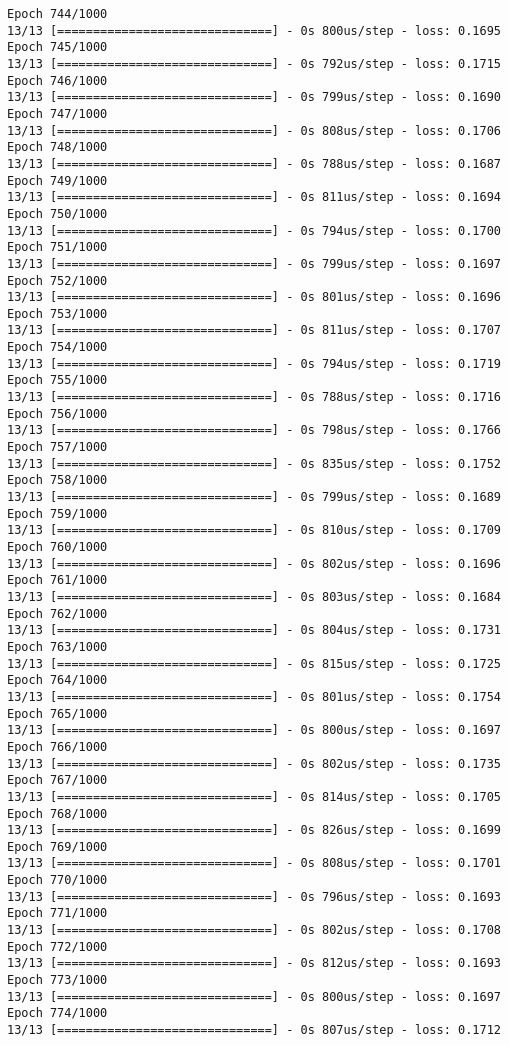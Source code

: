 \documentclass[11pt]{article}
\begin{document}
\begin{Verbatim}[commandchars=\\\{\}]
Epoch 744/1000
13/13 [==============================] - 0s 800us/step - loss: 0.1695
Epoch 745/1000
13/13 [==============================] - 0s 792us/step - loss: 0.1715
Epoch 746/1000
13/13 [==============================] - 0s 799us/step - loss: 0.1690
Epoch 747/1000
13/13 [==============================] - 0s 808us/step - loss: 0.1706
Epoch 748/1000
13/13 [==============================] - 0s 788us/step - loss: 0.1687
Epoch 749/1000
13/13 [==============================] - 0s 811us/step - loss: 0.1694
Epoch 750/1000
13/13 [==============================] - 0s 794us/step - loss: 0.1700
Epoch 751/1000
13/13 [==============================] - 0s 799us/step - loss: 0.1697
Epoch 752/1000
13/13 [==============================] - 0s 801us/step - loss: 0.1696
Epoch 753/1000
13/13 [==============================] - 0s 811us/step - loss: 0.1707
Epoch 754/1000
13/13 [==============================] - 0s 794us/step - loss: 0.1719
Epoch 755/1000
13/13 [==============================] - 0s 788us/step - loss: 0.1716
Epoch 756/1000
13/13 [==============================] - 0s 798us/step - loss: 0.1766
Epoch 757/1000
13/13 [==============================] - 0s 835us/step - loss: 0.1752
Epoch 758/1000
13/13 [==============================] - 0s 799us/step - loss: 0.1689
Epoch 759/1000
13/13 [==============================] - 0s 810us/step - loss: 0.1709
Epoch 760/1000
13/13 [==============================] - 0s 802us/step - loss: 0.1696
Epoch 761/1000
13/13 [==============================] - 0s 803us/step - loss: 0.1684
Epoch 762/1000
13/13 [==============================] - 0s 804us/step - loss: 0.1731
Epoch 763/1000
13/13 [==============================] - 0s 815us/step - loss: 0.1725
Epoch 764/1000
13/13 [==============================] - 0s 801us/step - loss: 0.1754
Epoch 765/1000
13/13 [==============================] - 0s 800us/step - loss: 0.1697
Epoch 766/1000
13/13 [==============================] - 0s 802us/step - loss: 0.1735
Epoch 767/1000
13/13 [==============================] - 0s 814us/step - loss: 0.1705
Epoch 768/1000
13/13 [==============================] - 0s 826us/step - loss: 0.1699
Epoch 769/1000
13/13 [==============================] - 0s 808us/step - loss: 0.1701
Epoch 770/1000
13/13 [==============================] - 0s 796us/step - loss: 0.1693
Epoch 771/1000
13/13 [==============================] - 0s 802us/step - loss: 0.1708
Epoch 772/1000
13/13 [==============================] - 0s 812us/step - loss: 0.1693
Epoch 773/1000
13/13 [==============================] - 0s 800us/step - loss: 0.1697
Epoch 774/1000
13/13 [==============================] - 0s 807us/step - loss: 0.1712

\end{Verbatim}
\end{document}
